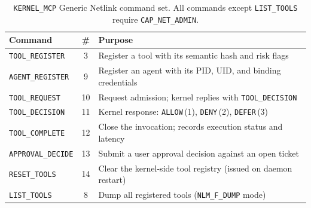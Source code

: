 \begin{table}[H]
\centering\small
\begin{tabular}{@{}lc p{8.2cm}@{}}
\toprule
\textbf{Command} & \textbf{\#} & \textbf{Purpose} \\
\midrule
\texttt{TOOL\_REGISTER}   & 3  & Register a tool with its semantic hash and risk flags \\
\texttt{AGENT\_REGISTER}  & 9  & Register an agent with its PID, UID, and binding credentials \\
\texttt{TOOL\_REQUEST}    & 10 & Request admission; kernel replies with \texttt{TOOL\_DECISION} \\
\texttt{TOOL\_DECISION}   & 11 & Kernel response: \texttt{ALLOW}\,(1), \texttt{DENY}\,(2), \texttt{DEFER}\,(3) \\
\texttt{TOOL\_COMPLETE}   & 12 & Close the invocation; records execution status and latency \\
\texttt{APPROVAL\_DECIDE} & 13 & Submit a user approval decision against an open ticket \\
\texttt{RESET\_TOOLS}     & 14 & Clear the kernel-side tool registry (issued on daemon restart) \\
\texttt{LIST\_TOOLS}      & 8  & Dump all registered tools (\texttt{NLM\_F\_DUMP} mode) \\
\bottomrule
\end{tabular}
\caption{\texttt{KERNEL\_MCP} Generic Netlink command set. All commands except \texttt{LIST\_TOOLS} require \texttt{CAP\_NET\_ADMIN}.}
\label{tab:netlink-cmds}
\end{table}

